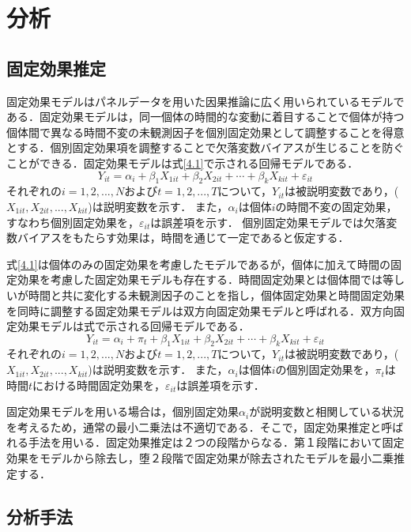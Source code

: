 \chapter{分析}

\section{固定効果推定}
固定効果モデルはパネルデータを用いた因果推論に広く用いられているモデルである．固定効果モデルは，同一個体の時間的な変動に着目することで個体が持つ個体間で異なる時間不変の未観測因子を個別固定効果として調整することを得意とする．個別固定効果項を調整することで欠落変数バイアスが生じることを防ぐことができる．固定効果モデルは式\ref{4.1}で示される回帰モデルである．
\begin{equation}
  Y_{it} = \alpha_{i} + \beta_{1}X_{1it} + \beta_{2}X_{2it} + \cdots  + \beta_{k}X_{kit} + \varepsilon_{it}
  \label{4.1}
\end{equation}
それぞれの$i=1,2,...,N$および$t=1,2,...,T$について，$Y_{it}$は被説明変数であり，($X_{1it},X_{2it},...,X_{kit}$)は説明変数を示す．
また，$\alpha_{i}$は個体$i$の時間不変の固定効果，すなわち個別固定効果を，$\varepsilon_{it}$は誤差項を示す．
個別固定効果モデルでは欠落変数バイアスをもたらす効果は，時間を通じて一定であると仮定する．

式\ref{4.1}は個体のみの固定効果を考慮したモデルであるが，個体に加えて時間の固定効果を考慮した固定効果モデルも存在する．時間固定効果とは個体間では等しいが時間と共に変化する未観測因子のことを指し，個体固定効果と時間固定効果を同時に調整する固定効果モデルは双方向固定効果モデルと呼ばれる．双方向固定効果モデルは式で示される回帰モデルである．
\begin{equation}
  Y_{it} = \alpha_{i} + \pi_{t} + \beta_{1}X_{1it} + \beta_{2}X_{2it} + \cdots  + \beta_{k}X_{kit} + \varepsilon_{it}
  \label{4.2}
\end{equation}
それぞれの$i=1,2,...,N$および$t=1,2,...,T$について，$Y_{it}$は被説明変数であり，($X_{1it},X_{2it},...,X_{kit}$)は説明変数を示す．
また，$\alpha_{i}$は個体$i$の個別固定効果を，$\pi_{t}$は時間$t$における時間固定効果を，$\varepsilon_{it}$は誤差項を示す．

固定効果モデルを用いる場合は，個別固定効果$\alpha_{i}$が説明変数と相関している状況を考えるため，通常の最小二乗法は不適切である．そこで，固定効果推定と呼ばれる手法を用いる．固定効果推定は２つの段階からなる．第１段階において固定効果をモデルから除去し，堕２段階で固定効果が除去されたモデルを最小二乗推定する．
\section{分析手法}

